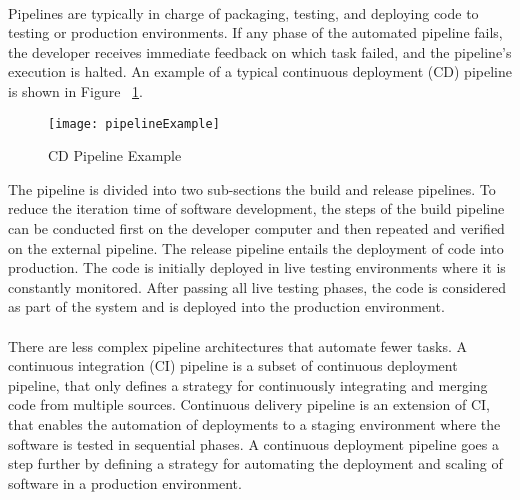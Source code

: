 \paragraph{}

Pipelines are typically in charge of packaging, testing, and deploying code to testing or production environments.
If any phase of the automated pipeline fails, the developer receives immediate feedback on which task failed, and the pipeline's execution is halted.
An example of a typical continuous deployment (CD) pipeline is shown in Figure ~\ref{fig:pipeline_example}.

\begin{figure}[htbp]
    \centering
    \texttt{[image: pipelineExample]}
    \caption{CD Pipeline Example}
    \label{fig:pipeline_example}
\end{figure}

The pipeline is divided into two sub-sections the build and release pipelines.
To reduce the iteration time of software development,
the steps of the build pipeline can be conducted first on the developer computer and then repeated and verified on the external pipeline.
The release pipeline entails the deployment of code into production.
The code is initially deployed in live testing environments where it is constantly monitored.
After passing all live testing phases, the code is considered as part of the system and is deployed into the production environment.

\paragraph{}

There are less complex pipeline architectures that automate fewer tasks.
A continuous integration (CI) pipeline is a subset of continuous deployment pipeline,
that only defines a strategy for continuously integrating and merging code from multiple sources.
Continuous delivery pipeline is an extension of CI, that enables the automation of deployments to a staging environment where the software is tested in sequential phases.
A continuous deployment pipeline goes a step further by defining a strategy for automating the deployment and scaling of software in a production environment.




